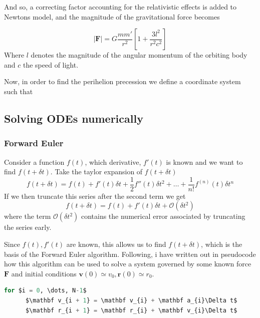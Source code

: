 \documentclass[10pt,showpacs,preprintnumbers,footinbib,amsmath,amssymb,aps,prl,twocolumn,groupedaddress,superscriptaddress,showkeys]{revtex4-1}
\begin{document}
      And so, a correcting factor accounting for the relativistic effects is added to Newtons model, and the magnitude of the gravitational force becomes \cite{problem_set}

      \begin{equation}
        |\mathbf F| = G \frac{m m'}{r^2}\left[1 + \frac{3l^2}{r^2c^2}\right]
      \end{equation}
      Where $l$ denotes the magnitude of the angular momentum of the orbiting body and $c$ the speed of light.

      Now, in order to find the perihelion precession we define a coordinate system such that 

\subsection{Solving ODEs numerically}
  \subsubsection{Forward Euler}
    Consider a function $f(t)$, which derivative, $f'(t)$ is known and we want to find $f(t + \delta t)$. 
    Take the taylor expansion of $f(t + \delta t)$
    \begin{equation}
      f(t + \delta t) = f(t) + f'(t)\delta t + \frac{1}{2}f''(t)\delta t^2 + \dots + \frac{1}{n!}f^{(n)}(t)\delta t^n
    \end{equation}
    If we then truncate this series after the second term we get
    \begin{equation}
      f(t + \delta t) = f(t) + f'(t)\delta t + \mathcal O(\delta t^2)
    \end{equation}
    where the term $\mathcal O(\delta t^2)$ contains the numerical error associated by truncating the series early.

    Since $f(t), f'(t)$ are known, this allows us to find $f(t + \delta t)$, which is the basis of the Forward Euler algorithm. Following, i have written out in pseudocode how this algorithm can be used to solve a system governed by some known force $\mathbf F$ and initial conditions $\mathbf v(0) \simeq v_0, \mathbf r(0) \simeq r_0$.

    \begin{lstlisting}[mathescape=true, language=python, title=Forward Euler Algorithm]
  for $i = 0, \dots, N-1$
      $\mathbf v_{i + 1} = \mathbf v_{i} + \mathbf a_{i}\Delta t$
      $\mathbf r_{i + 1} = \mathbf r_{i} + \mathbf v_{i}\Delta t$
  \end{lstlisting}
\end{document}
